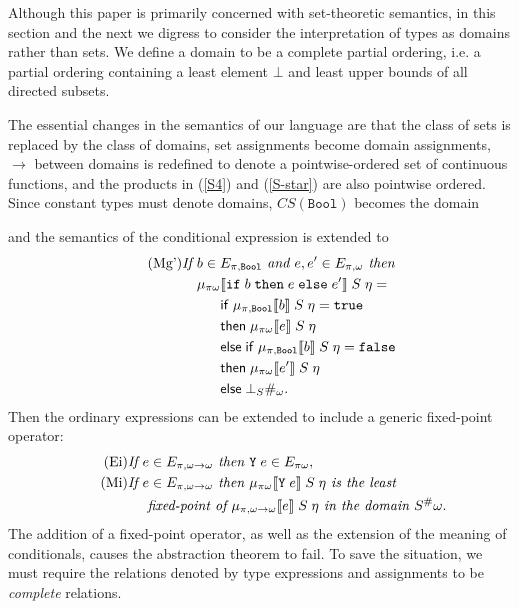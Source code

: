 \documentclass[sigplan,screen,nonacm,balance=false]{acmart}
\makeatletter
\theoremstyle{plain}
\DeclarePairedDelimiter{\interp}{\llbracket}{\rrbracket}
\newcommand{\ie}{i.e.\@\xspace}
\newcommand{\Bool}{\mathtt{Bool}}
\newcommand{\true}{\mathtt{true}}
\newcommand{\false}{\mathtt{false}}
\newcommand{\ifte}[3]{\mathtt{if} \; #1 \; \mathtt{then} \; #2 \; \mathtt{else} \; #3}
\newcommand{\Y}{\mathtt{Y}}
\newcommand{\ifm}{\mathsf{if}}
\newcommand{\thenm}{\mathsf{then}}
\newcommand{\elsem}{\mathsf{else}}
\newcommand{\CS}{\mathit{CS}}
\makeatother
\begin{document}
Although this paper is primarily concerned with set-theoretic semantics, in this section and the next we digress to consider the interpretation of types as domains rather than sets.
We define a domain to be a complete partial ordering, \ie a partial ordering containing a least element $\bot$ and least upper bounds of all directed subsets.

The essential changes in the semantics of our language are that the class of sets is replaced by the class of domains, set assignments become domain assignments, $\to$ between domains is redefined to denote a pointwise-ordered set of continuous functions, and the products in (\ref{S4}) and (\ref{S-star}) are also pointwise ordered.
Since constant types must denote domains, $\CS(\Bool)$ becomes the domain

\begin{center}
\end{center}

and the semantics of the conditional expression is extended to
%
\begin{align*}\tag{Mg'}
  \textit{If } & b \in E_{\pi, \Bool} \textit{ and } e, e' \in E_{\pi, \omega} \textit{ then } \\
  & \mu_{\pi \omega} \interp{\ifte{b}{e}{e'}} \; S \; \eta = \\
  & \phantom{\mu_{\pi \omega}} \ifm \; \mu_{\pi, \Bool} \interp{b} \; S \; \eta = \true \\
  & \phantom{\mu_{\pi \omega}} \thenm \; \mu_{\pi \omega} \interp{e} \; S \; \eta \\
  & \phantom{\mu_{\pi \omega}} \elsem \; \ifm \; \mu_{\pi, \Bool} \interp{b} \; S \; \eta = \false \\
  & \phantom{\mu_{\pi \omega}} \thenm \; \mu_{\pi \omega} \interp{e'} \; S \; \eta \\
  & \phantom{\mu_{\pi \omega}} \elsem \; \bot_S \#_\omega.
\end{align*}
%
Then the ordinary expressions can be extended to include a generic fixed-point operator:
%
\begin{align*}
  \tag{Ei}
  \textit{If } & e \in E_{\pi, \omega \to \omega} \textit{ then } \Y \; e \in E_{\pi \omega}, \\
  \tag{Mi}
  \textit{If } & e \in E_{\pi, \omega \to \omega} \textit{ then } \mu_{\pi \omega} \interp{\Y \; e} \; S \; \eta \textit{ is the least }\\
  & \textit{ fixed-point of } \mu_{\pi, \omega \to \omega} \interp{e} \; S \; \eta \textit{ in the domain } S^\# \omega.
\end{align*}
%
The addition of a fixed-point operator, as well as the extension of the meaning of conditionals, causes the abstraction theorem to fail.
To save the situation, we must require the relations denoted by type expressions and assignments to be \emph{complete} relations.
\end{document}
